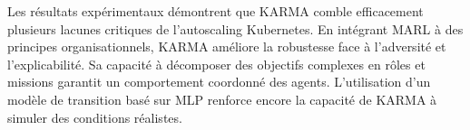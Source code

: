 Les résultats expérimentaux démontrent que KARMA comble efficacement plusieurs lacunes critiques de l'autoscaling Kubernetes. En intégrant MARL à des principes organisationnels, KARMA améliore la robustesse face à l'adversité et l'explicabilité. Sa capacité à décomposer des objectifs complexes en rôles et missions garantit un comportement coordonné des agents. L'utilisation d'un modèle de transition basé sur MLP renforce encore la capacité de KARMA à simuler des conditions réalistes.
%
%

